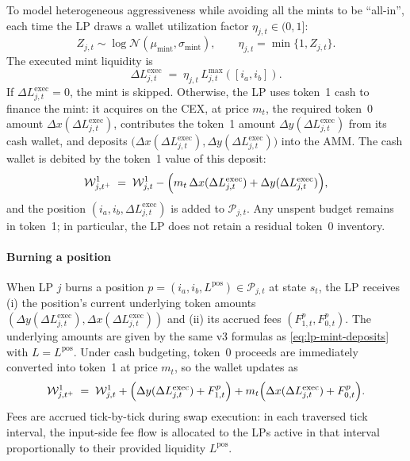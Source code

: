 \documentclass[11pt]{article}
\begin{document}
To model heterogeneous aggressiveness while avoiding all the mints to be ``all-in'', each time the LP draws
a wallet utilization factor $\eta_{j,t}\in(0,1]$:
\begin{equation}
  Z_{j,t}\sim \log\mathcal{N}(\mu_{\mathrm{mint}},\sigma_{\mathrm{mint}}),\qquad
  \eta_{j,t}=\min\{1,Z_{j,t}\}.
  \label{eq:lp-utilization}
\end{equation}
The executed mint liquidity is
\begin{equation}
  \Delta L^{\text{exec}}_{j,t} \;=\; \eta_{j,t}\,L^{\max}_{j,t}([i_a,i_b]).
  \label{eq:lp-mint-executed}
\end{equation}
If $\Delta L^{\text{exec}}_{j,t}=0$, the mint is skipped. Otherwise, the LP uses token~1 cash to finance the mint: it
acquires on the CEX, at price $m_t$, the required token~0 amount $\Delta x(\Delta L^{\text{exec}}_{j,t})$, contributes the
token~1 amount $\Delta y(\Delta L^{\text{exec}}_{j,t})$ from its cash wallet, and deposits
$\bigl(\Delta x(\Delta L^{\text{exec}}_{j,t}),\Delta y(\Delta L^{\text{exec}}_{j,t})\bigr)$ into the AMM.
The cash wallet is debited by the token~1 value of this deposit:
\begin{equation}
  \mathcal{W}^1_{j,t^+}
  \;=\;
  \mathcal{W}^1_{j,t}
  -
  \Bigl(
    m_t\,\Delta x(\Delta L^{\text{exec}}_{j,t})
    +
    \Delta y(\Delta L^{\text{exec}}_{j,t})
  \Bigr),
  \label{eq:lp-wallet-debit-cash}
\end{equation}
and the position $(i_a,i_b,\Delta L^{\text{exec}}_{j,t})$ is added to $\mathcal{P}_{j,t}$. Any unspent budget
remains in token~1; in particular, the LP does not retain a residual token~0 inventory.

\paragraph{Burning a position}
When LP $j$ burns a position $p=(i_a,i_b,L^{\mathrm{pos}})\in\mathcal{P}_{j,t}$ at state $s_t$, the LP receives
(i) the position's current underlying token amounts $\left(\Delta y(\Delta L^{\text{exec}}_{j,t}), \Delta x(\Delta L^{\text{exec}}_{j,t})\right)$ and
(ii) its accrued fees $\left(F^{p}_{1,t}, F^{p}_{0,t}\right)$.
The underlying amounts are given by the same v3 formulas as \eqref{eq:lp-mint-deposits} with $L=L^{\mathrm{pos}}$.
Under cash budgeting, token~0 proceeds are immediately converted into token~1 at price $m_t$, so the wallet
updates as
\begin{equation}
  \mathcal{W}^1_{j,t^+}
  \;=\;
  \mathcal{W}^1_{j,t}
  +
  \Bigl(    \Delta y(\Delta L^{\text{exec}}_{j,t})+F^{p}_{1,t}\Bigr)
  +
  m_t\Bigl(\Delta x(\Delta L^{\text{exec}}_{j,t})+F^{p}_{0,t}\Bigr).
  \label{eq:lp-wallet-credit-cash}
\end{equation}
Fees are accrued tick-by-tick during swap execution: in each traversed tick
interval, the input-side fee flow is allocated to the LPs active in that interval proportionally to their
provided liquidity $L^{\mathrm{pos}}$.
\end{document}
